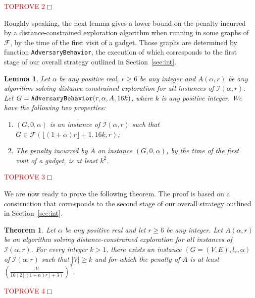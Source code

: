 \documentclass[11pt]{article}
\newtheorem{theorem}{Theorem}[section]
\newtheorem{lemma}{Lemma}[section]
\newcommand{\qed}{\hfill $\Box$ \bigbreak}
\newenvironment{proof}{\noindent {\bf Proof.}}{\qed}
\begin{document}
{\begin{proof}\textcolor{red}{TOPROVE 2}\end{proof}

Roughly speaking, the next lemma gives a lower bound on the penalty incurred by a distance-constrained exploration algorithm when running in some graphs of $\mathcal{F}$, by the time of the first visit of a gadget. Those graphs are determined by function {\tt AdversaryBehavior}, the execution of which corresponds to the first stage of our overall strategy outlined in Section~\ref{sec:int}.

\begin{lemma}
\label{lem:penagadget}
Let $\alpha$ be any positive real, $r\geq 6$ be any integer and $A(\alpha,r)$ be any algorithm solving distance-constrained exploration for all instances of $\mathcal{I}(\alpha,r)$. Let $G={\tt AdversaryBehavior}(r,\alpha,A,16k)$, where $k$ is any positive integer. We have the following two properties:  
\begin{enumerate}
\item $(G,0,\alpha)$ is an instance of $\mathcal{I}(\alpha,r)$ such that $G\in\mathcal{F}(\lfloor(1+\alpha)r\rfloor+1,16k,r)$;
\item The penalty incurred by $A$ on instance $(G,0,\alpha)$, by the time of the first visit of a gadget, is at least $k^2$.
\end{enumerate}
\end{lemma}

\begin{proof}\textcolor{red}{TOPROVE 3}\end{proof}

We are now ready to prove the following theorem. The proof is based on a construction that corresponds to the second stage of our overall strategy outlined in Section~\ref{sec:int}.

\begin{theorem}
\label{theo:theo1}
Let $\alpha$ be any positive real and let $r\geq 6$ be any integer. Let $A(\alpha,r)$ be an algorithm solving distance-constrained exploration for all instances of $\mathcal{I}(\alpha,r)$. For every integer $k>1$, there exists an instance $(G=(V,E),l_s,\alpha)$ of $\mathcal{I}(\alpha,r)$ such that $|V|\geq k$ and for which the penalty of $A$ is at least $\left(\frac{|V|}{16\left(2\left\lfloor(1+\alpha)r\right\rfloor+3\right)}\right)^2$.
\end{theorem}

\begin{proof}\textcolor{red}{TOPROVE 4}\end{proof}

}
\end{document}
